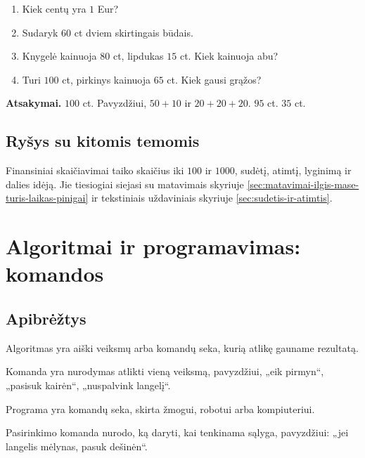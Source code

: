 \begin{enumerate}
\item Kiek centų yra \(1\) Eur?
\item Sudaryk \(60\) ct dviem skirtingais būdais.
\item Knygelė kainuoja \(80\) ct, lipdukas \(15\) ct. Kiek kainuoja abu?
\item Turi \(100\) ct, pirkinys kainuoja \(65\) ct. Kiek gausi grąžos?
\end{enumerate}

\textbf{Atsakymai.} \(100\) ct. Pavyzdžiui, \(50+10\) ir \(20+20+20\). \(95\) ct. \(35\) ct.

\subsection{Ryšys su kitomis temomis}

Finansiniai skaičiavimai taiko skaičius iki \(100\) ir \(1000\), sudėtį, atimtį, lyginimą ir dalies idėją. Jie tiesiogiai siejasi su matavimais skyriuje \ref{sec:matavimai-ilgis-mase-turis-laikas-pinigai} ir tekstiniais uždaviniais skyriuje \ref{sec:sudetis-ir-atimtis}.

\section{Algoritmai ir programavimas: komandos}\label{sec:algoritmai-ir-programavimas-komandos}

\subsection{Apibrėžtys}

\begin{apibreztis}
Algoritmas yra aiški veiksmų arba komandų seka, kurią atlikę gauname rezultatą.
\end{apibreztis}

\begin{apibreztis}
Komanda yra nurodymas atlikti vieną veiksmą, pavyzdžiui, „eik pirmyn“, „pasisuk kairėn“, „nuspalvink langelį“.
\end{apibreztis}

\begin{apibreztis}
Programa yra komandų seka, skirta žmogui, robotui arba kompiuteriui.
\end{apibreztis}

\begin{apibreztis}
Pasirinkimo komanda nurodo, ką daryti, kai tenkinama sąlyga, pavyzdžiui: „jei langelis mėlynas, pasuk dešinėn“.
\end{apibreztis}

